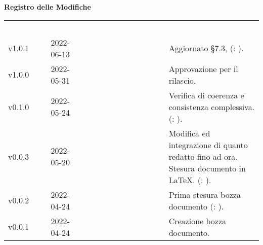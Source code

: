 
{\LARGE{\textbf{Registro delle Modifiche}}} \\
\renewcommand{\arraystretch}{1.5}
\begin{longtable}{ m{}<{\centering}  m{}<{\centering}  m{}<{\centering}  m{}<{\centering}  m{}<{\centering} }
	\rowcolor{darkblue}
	\textcolor{white}{\textbf{Versione}} &\textcolor{white}{\textbf{Data}}& \textcolor{white}{\textbf{Nominativo}} & \textcolor{white}{\textbf{Ruolo}}&\textcolor{white}{\textbf{Descrizione}}\\ 

	v1.0.1 & 2022-06-13 & \GC & \PR & Aggiornato \S{7.3}, (\VE: \textit{\PV}).\\

	v1.0.0 & 2022-05-31 & \MG & \RE & Approvazione per il rilascio.	 \\
	
	v0.1.0 & 2022-05-24 & \GC & \PR & Verifica di coerenza e consistenza complessiva. (\VE: \textit{\PV}). \\

	v0.0.3 & 2022-05-20 & \GC & \PR & Modifica ed integrazione di quanto redatto fino ad ora. Stesura documento in \LaTeX{}. (\VE: \textit{\PV}). \\

	v0.0.2 & 2022-04-24 & \GC & \PR & Prima stesura bozza documento (\VE: \textit{\PV}). \\

	v0.0.1 & 2022-04-24 & \GC & \PR & Creazione bozza documento. \\

\end{longtable}

\pagebreak